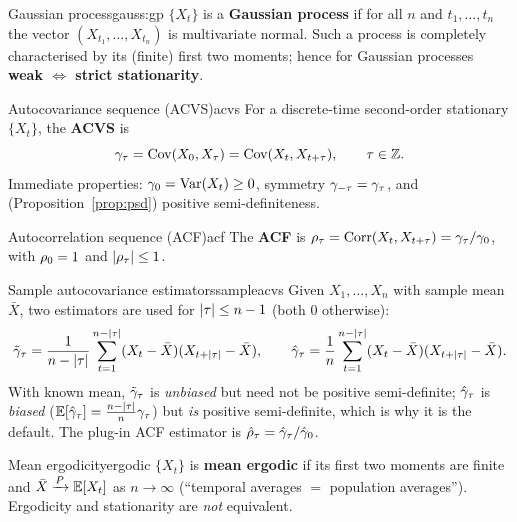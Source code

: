 \begin{definition}{Gaussian process}{gauss:gp}
$\{X_t\}$ is a \textbf{Gaussian process} if for all $n$ and $t_1,\dots,t_n$ the
vector $(X_{t_1},\dots,X_{t_n})$ is multivariate normal. Such a process is
completely characterised by its (finite) first two moments; hence for Gaussian
processes \textbf{weak $\Leftrightarrow$ strict stationarity}.
\end{definition}

\begin{definition}{Autocovariance sequence (ACVS)}{acvs}
For a discrete-time second-order stationary $\{X_t\}$, the \textbf{ACVS} is
\[
\gamma_\tau=\operatorname{Cov}(X_0,X_\tau)=\operatorname{Cov}(X_t,X_{t+\tau}),\qquad \tau\in\mathbb{Z} .
\]
Immediate properties: $\gamma_0=\operatorname{Var}(X_t)\ge0$, symmetry $\gamma_{-\tau}=\gamma_\tau$,
and (Proposition~\ref{prop:psd}) positive semi-definiteness.
\end{definition}

\begin{definition}{Autocorrelation sequence (ACF)}{acf}
The \textbf{ACF} is $\rho_\tau=\operatorname{Corr}(X_t,X_{t+\tau})=\gamma_\tau/\gamma_0$, with
$\rho_0=1$ and $\left\lvert \rho_\tau \right\rvert\le1$.
\end{definition}

\begin{definition}{Sample autocovariance estimators}{sampleacvs}
Given $X_1,\dots,X_n$ with sample mean $\bar X$, two estimators are used for
$\left\lvert \tau \right\rvert\le n-1$ (both $0$ otherwise):
\[
\tilde{\gamma}_\tau=\frac{1}{n-\left\lvert \tau \right\rvert}\sum_{t=1}^{n-\left\lvert \tau \right\rvert}(X_t-\bar X)(X_{t+\left\lvert \tau \right\rvert}-\bar X),
\qquad
\hat{\gamma}_\tau=\frac{1}{n}\sum_{t=1}^{n-\left\lvert \tau \right\rvert}(X_t-\bar X)(X_{t+\left\lvert \tau \right\rvert}-\bar X).
\]
With known mean, $\tilde{\gamma}_\tau$ is \emph{unbiased} but need not be
positive semi-definite; $\hat{\gamma}_\tau$ is \emph{biased}
($\mathbb{E}[\hat{\gamma}_\tau]=\tfrac{n-\left\lvert \tau \right\rvert}{n}\gamma_\tau$) but \emph{is} positive
semi-definite, which is why it is the default. The plug-in ACF estimator is
$\hat{\rho}_\tau=\hat{\gamma}_\tau/\hat{\gamma}_0$.
\end{definition}

\begin{definition}{Mean ergodicity}{ergodic}
$\{X_t\}$ is \textbf{mean ergodic} if its first two moments are finite and
$\bar X\xrightarrow{P} \mathbb{E}[X_t]$ as $n\to\infty$ (``temporal averages
$=$ population averages''). Ergodicity and stationarity are \emph{not}
equivalent.
\end{definition}

